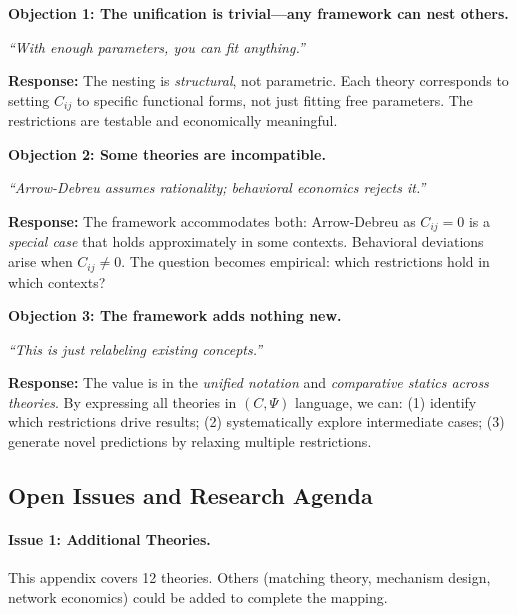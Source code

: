\begin{tcolorbox}[colback=red!5!white, colframe=red!75!black,
    title=\textbf{Critical Foundations: Objections and Responses}]

\textbf{Objection 1: The unification is trivial---any framework can nest others.}

\textit{``With enough parameters, you can fit anything.''}

\textbf{Response:} The nesting is \textit{structural}, not parametric. Each theory
corresponds to setting $C_{ij}$ to specific functional forms, not just fitting
free parameters. The restrictions are testable and economically meaningful.

\medskip

\textbf{Objection 2: Some theories are incompatible.}

\textit{``Arrow-Debreu assumes rationality; behavioral economics rejects it.''}

\textbf{Response:} The framework accommodates both: Arrow-Debreu as $C_{ij} = 0$
is a \textit{special case} that holds approximately in some contexts. Behavioral
deviations arise when $C_{ij} \neq 0$. The question becomes empirical: which
restrictions hold in which contexts?

\medskip

\textbf{Objection 3: The framework adds nothing new.}

\textit{``This is just relabeling existing concepts.''}

\textbf{Response:} The value is in the \textit{unified notation} and \textit{comparative
statics across theories}. By expressing all theories in $(C, \Psi)$ language,
we can: (1) identify which restrictions drive results; (2) systematically explore
intermediate cases; (3) generate novel predictions by relaxing multiple restrictions.

\end{tcolorbox}


\subsection{Open Issues and Research Agenda}
\label{sec:A-openissues}

\paragraph{Issue 1: Additional Theories.}
This appendix covers 12 theories. Others (matching theory, mechanism design,
network economics) could be added to complete the mapping.

